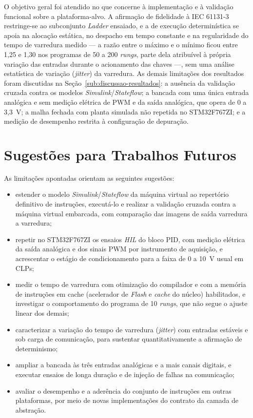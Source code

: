 O objetivo geral foi atendido no que concerne à implementação e à validação funcional sobre a plataforma-alvo.
A afirmação de fidelidade à IEC 61131-3 restringe-se ao subconjunto \textit{Ladder} ensaiado, e a de execução determinística se apoia na alocação estática, no despacho em tempo constante e na regularidade do tempo de varredura medido --- a razão entre o máximo e o mínimo ficou entre 1,25 e 1,30 nos programas de 50 a 200 \textit{rungs}, parte dela atribuível à própria variação das entradas durante o acionamento das chaves ---, sem uma análise estatística de variação (\textit{jitter}) da varredura.
As demais limitações dos resultados foram discutidas na Seção~\ref{sub:discussao-resultados}: a ausência da validação cruzada contra os modelos \textit{Simulink}/\textit{Stateflow}; a bancada com uma única entrada analógica e sem medição elétrica de PWM e da saída analógica, que opera de 0 a 3,3~V; a malha fechada com planta simulada não repetida no STM32F767ZI; e a medição de desempenho restrita à configuração de depuração.

\section{Sugestões para Trabalhos Futuros}
\label{sec:futuros}

As limitações apontadas orientam as seguintes sugestões:

\begin{itemize}
    \item estender o modelo \textit{Simulink}/\textit{Stateflow} da máquina virtual ao repertório definitivo de instruções, executá-lo e realizar a validação cruzada contra a máquina virtual embarcada, com comparação das imagens de saída varredura a varredura;
    \item repetir no STM32F767ZI os ensaios \textit{HIL} do bloco PID, com medição elétrica da saída analógica e dos sinais PWM por instrumento de aquisição, e acrescentar o estágio de condicionamento para a faixa de 0 a 10~V usual em CLPs;
    \item medir o tempo de varredura com otimização do compilador e com a memória de instruções em cache (acelerador de \textit{Flash} e \textit{cache} do núcleo) habilitados, e investigar o comportamento do programa de 10 \textit{rungs}, que não segue o ajuste linear dos demais;
    \item caracterizar a variação do tempo de varredura (\textit{jitter}) com entradas estáveis e sob carga de comunicação, para sustentar quantitativamente a afirmação de determinismo;
    \item ampliar a bancada às três entradas analógicas e a mais canais digitais, e executar ensaios de longa duração e de injeção de falhas na comunicação;
    \item avaliar o desempenho e a aderência do conjunto de instruções em outras plataformas, por meio de novas implementações do contrato da camada de abstração.
\end{itemize}
